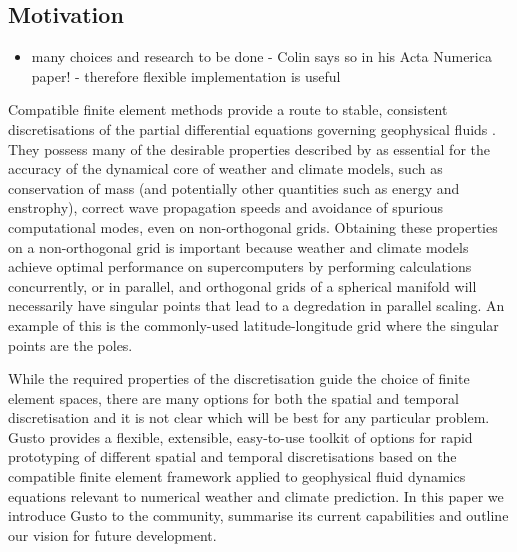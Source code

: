 \documentclass[journal abbreviation, manuscript]{copernicus}
\begin{document}
\introduction   %

\subsection{Motivation}
\begin{itemize}
\item many choices and research to be done - Colin says so in his Acta Numerica paper! - therefore flexible implementation is useful
\end{itemize}

Compatible finite element methods provide a route to stable,
consistent discretisations of the partial differential equations
governing geophysical fluids \citep{cotter2023compatible}. They
possess many of the desirable properties described by
\citet{staniforth2012horizontal} as essential for the accuracy of the
dynamical core of weather and climate models, such as conservation of
mass (and potentially other quantities such as energy and enstrophy),
correct wave propagation speeds and avoidance of spurious
computational modes, even on non-orthogonal grids. Obtaining these
properties on a non-orthogonal grid is important because weather and
climate models achieve optimal performance on supercomputers by
performing calculations concurrently, or in parallel, and orthogonal
grids of a spherical manifold will necessarily have singular points
that lead to a degredation in parallel scaling. An example of this is
the commonly-used latitude-longitude grid where the singular points
are the poles.


While the required properties of the discretisation guide the choice
of finite element spaces, there are many options for both the spatial
and temporal discretisation and it is not clear which will be best for
any particular problem. Gusto provides a flexible, extensible,
easy-to-use toolkit of options for rapid prototyping of different
spatial and temporal discretisations based on the compatible finite
element framework applied to geophysical fluid dynamics equations
relevant to numerical weather and climate prediction. In this paper we
introduce Gusto to the community, summarise its current capabilities
and outline our vision for future development.
\end{document}
